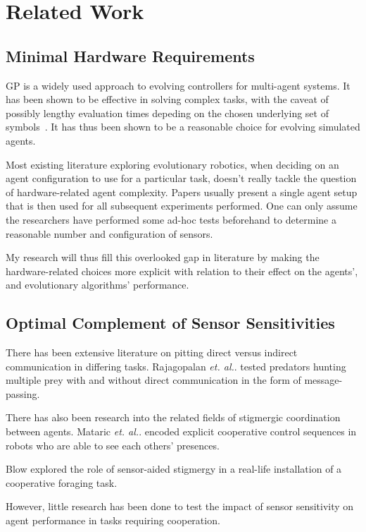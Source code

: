 \documentclass[a4paper,12pt]{article}
\begin{document}
\section{Related Work}

\subsection{Minimal Hardware Requirements}
GP is a widely used approach to evolving controllers for multi-agent systems. It has been shown to be effective in solving complex tasks, with the caveat of possibly lengthy evaluation times depeding on the chosen underlying set of symbols~\cite{gpchallenges,stgp}. It has thus been shown to be a reasonable choice for evolving simulated agents.

Most existing literature exploring evolutionary robotics, when deciding on an agent configuration to use for a particular task, doesn’t really tackle the question of hardware-related agent complexity. Papers usually present a single agent setup that is then used for all subsequent experiments performed\cite{Waibel09, Sims94}. One can only assume the researchers have performed some ad-hoc tests beforehand to determine a reasonable number and configuration of sensors.

My research will thus fill this overlooked gap in literature by making the hardware-related choices more explicit with relation to their effect on the agents’, and evolutionary algorithms’ performance.

\subsection{Optimal Complement of Sensor Sensitivities}
There has been extensive literature on pitting direct versus indirect communication in differing tasks. Rajagopalan \textit{et. al.}. tested predators hunting multiple prey with and without direct communication in the form of message-passing. \cite{Rajagopalan11}

There has also been research into the related fields of stigmergic coordination between agents. Mataric \textit{et. al.}. encoded explicit cooperative control sequences in robots who are able to see each others’ presences. \cite{Werger99}

Blow \cite{Blow04} explored the role of sensor-aided stigmergy in a real-life installation of a cooperative foraging task. 

However, little research has been done to test the impact of sensor sensitivity on agent performance in tasks requiring cooperation.
\end{document}

